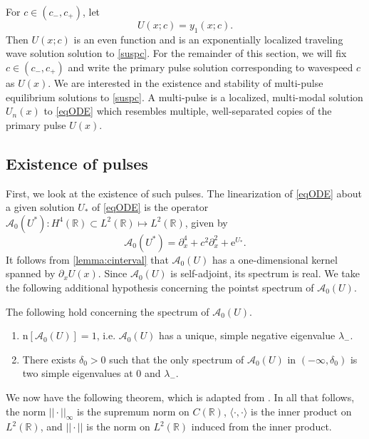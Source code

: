 \documentclass[review,onefignum,onetabnum]{siamart171218}
\newcommand{\R}{\mathbb{R}}
\newcommand{\rme}{\mathrm{e}}
\newcommand{\rmn}{\mathrm{n}}
\newcommand{\calA}{\mathcal{A}}
\begin{document}
For $c \in (c_-, c_+)$, let
\begin{equation}\label{suspU}
U(x; c) = y_1(x; c).
\end{equation}
Then $U(x; c)$ is an even function and is an exponentially localized traveling wave solution solution to \cref{suspc}. For the remainder of this section, we will fix $c \in (c_-, c_+)$ and write the primary pulse solution corresponding to wavespeed $c$ as $U(x)$. We are interested in the existence and stability of multi-pulse equilibrium solutions to \cref{suspc}. A multi-pulse is a localized, multi-modal solution $U_n(x)$ to \cref{eqODE} which resembles multiple, well-separated copies of the primary pulse $U(x)$.

\subsection{Existence of pulses}

First, we look at the existence of such pulses. The linearization of \cref{eqODE} about a given solution $U_*$ of \cref{eqODE} is the operator $\calA_0(U^*): H^4(\R) \subset L^2(\R) \mapsto L^2(\R)$, given by
\begin{equation}\label{defA0}
\calA_0(U^*) = \partial_x^4 + c^2 \partial_x^2 + \rme^{U_*}.
\end{equation}
It follows from \cref{lemma:cinterval} that $\calA_0(U)$ has a one-dimensional kernel spanned by $\partial_x U(x)$. Since $\calA_0(U)$ is self-adjoint, its spectrum is real. We take the following additional hypothesis concerning the pointst spectrum of $\calA_0(U)$.

\begin{hypothesis}\label{A0hyp}
The following hold concerning the spectrum of $\calA_0(U)$.
\begin{enumerate}
\item $\rmn[\calA_0(U)]=1$, i.e. $\calA_0(U)$ has a unique, simple negative eigenvalue $\lambda_-$.
\item There exists $\delta_0 > 0$ such that the only spectrum of $\calA_0(U)$ in $(-\infty, \delta_0)$ is two simple eigenvalues at $0$ and $\lambda_-$.
\end{enumerate}
\end{hypothesis}

We now have the following theorem, which is adapted from \cite[Theorem~3.6]{sandstede:iol97}. In all that follows, the norm $||\cdot||_\infty$ is the supremum norm on $C(\R)$, $\langle \cdot, \cdot \rangle$ is the inner product on $L^2(\R)$, and $|| \cdot ||$ is the norm on $L^2(\R)$ induced from the inner product.
\end{document}
